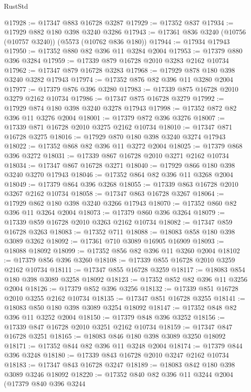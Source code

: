 \begin{lexlean}{RustStd}
\begin{coremodule}
@17928 := @17347 @883 @16728 @3287
@17929 := @17352 @837
@17934 := @17929 @882 @180 @398 @3240 @3286
@17943 := @17361 @836 @3240 (@10756 (@10757 @3240)) (@5573 (@10762 @836 @180))
@17944 := @17934 @17943
@17950 := @17352 @880 @82 @396 @11 @3284 @2004
@17953 := @17379 @880 @396 @3284
@17959 := @17339 @879 @16728 @2010 @3283 @2162 @10734
@17962 := @17347 @879 @16728 @3283
@17968 := @17929 @878 @180 @398 @3240 @3282 @17943
@17974 := @17352 @876 @82 @396 @11 @3280 @2004
@17977 := @17379 @876 @396 @3280
@17983 := @17339 @875 @16728 @2010 @3279 @2162 @10734
@17986 := @17347 @875 @16728 @3279
@17992 := @17929 @874 @180 @398 @3240 @3278 @17943
@17998 := @17352 @872 @82 @396 @11 @3276 @2004
@18001 := @17379 @872 @396 @3276
@18007 := @17339 @871 @16728 @2010 @3275 @2162 @10734
@18010 := @17347 @871 @16728 @3275
@18016 := @17929 @870 @180 @398 @3240 @3274 @17943
@18022 := @17352 @868 @82 @396 @11 @3272 @2004
@18025 := @17379 @868 @396 @3272
@18031 := @17339 @867 @16728 @2010 @3271 @2162 @10734
@18034 := @17347 @867 @16728 @3271
@18040 := @17929 @866 @180 @398 @3240 @3270 @17943
@18046 := @17352 @864 @82 @396 @11 @3268 @2004
@18049 := @17379 @864 @396 @3268
@18055 := @17339 @863 @16728 @2010 @3267 @2162 @10734
@18058 := @17347 @863 @16728 @3267
@18064 := @17929 @862 @180 @398 @3240 @3266 @17943
@18070 := @17352 @860 @82 @396 @11 @3264 @2004
@18073 := @17379 @860 @396 @3264
@18079 := @17339 @859 @16728 @2010 @3263 @2162 @10734
@18082 := @17347 @859 @16728 @3263
@18083 := @17352 @711
@18088 := @18083 @858 @180 @398 @3089 @3262
@18092 := @17361 @710 @3089 @16905 @16909
@18093 := @18088 @18092
@18099 := @17352 @856 @82 @396 @11 @3260 @2004
@18102 := @17379 @856 @396 @3260
@18108 := @17339 @855 @16728 @2010 @3259 @2162 @10734
@18111 := @17347 @855 @16728 @3259
@18117 := @18083 @854 @180 @398 @3089 @3258 @18092
@18123 := @17352 @852 @82 @396 @11 @3256 @2004
@18126 := @17379 @852 @396 @3256
@18132 := @17339 @851 @16728 @2010 @3255 @2162 @10734
@18135 := @17347 @851 @16728 @3255
@18141 := @18083 @850 @180 @398 @3089 @3254 @18092
@18147 := @17352 @848 @82 @396 @11 @3252 @2004
@18150 := @17379 @848 @396 @3252
@18156 := @17339 @847 @16728 @2010 @3251 @2162 @10734
@18159 := @17347 @847 @16728 @3251
@18165 := @18083 @846 @180 @398 @3089 @3250 @18092
@18171 := @17352 @844 @82 @396 @11 @3248 @2004
@18174 := @17379 @844 @396 @3248
@18180 := @17339 @843 @16728 @2010 @3247 @2162 @10734
@18183 := @17347 @843 @16728 @3247
@18189 := @18083 @842 @180 @398 @3089 @3246 @18092
@18220 := @17352
    @840
    @82
    @396
    @11
    @3244
    @2004
    (@17379
      @840
      @396
      @3244

\end{coremodule}
\end{lexlean}
